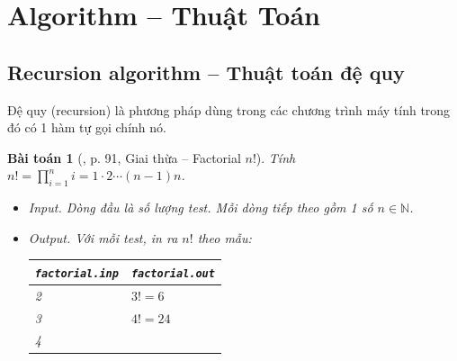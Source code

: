\documentclass{article}
\newtheorem{baitoan}{Bài toán}
\begin{document}

\section{Algorithm -- Thuật Toán}

\subsection{Recursion algorithm -- Thuật toán đệ quy}
Đệ quy (recursion) là phương pháp dùng trong các chương trình máy tính trong đó có 1 hàm tự gọi chính nó.

\begin{baitoan}[\cite{VietSTEM2021}, p. 91, Giai thừa -- Factorial $n!$]
	Tính $n! = \prod_{i=1}^n i = 1\cdot2\cdots(n - 1)n$.
	\begin{itemize}
		\item {\sf Input.} Dòng đầu là số lượng test. Mỗi dòng tiếp theo gồm 1 số $n\in\mathbb{N}$.
		\item {\sf Output.} Với mỗi test, in ra $n!$ theo mẫu:
		\begin{table}[H]
			\centering
			\begin{tabular}{|l|l|}
				\hline
				{\tt factorial.inp} & {\tt factorial.out} \\
				\hline
				2 & $3! = 6$ \\
				3 & $4! = 24$ \\
				4 &  \\
				\hline
			\end{tabular}
		\end{table}
	\end{itemize}
\end{baitoan}
\end{document}
